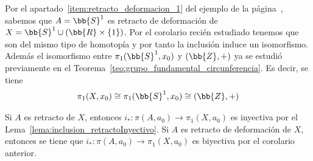 \begin{ejemplo} 
    Por el apartado~\ref{item:retracto_deformacion_1} del ejemplo de la página~\pageref{ejem:retracto_deformacion}, sabemos que $A=\bb{S}^1$ es retracto de deformación de $X=\bb{S}^1 \cup (\bb{R}\times\{1\})$. Por el corolario recién estudiado tenemos que son del mismo tipo de homotopía y por tanto la inclusión induce un isomorfismo. Además el isomorfismo entre $\pi_1(\bb{S}^1, x_0)$ y $(\bb{Z},+)$ ya se estudió previamente en el Teorema~\ref{teo:grupo_fundamental_circunferencia}. Es decir, se tiene
    \begin{gather*}
        \pi_1(X,x_0) \cong \pi_1(\bb{S}^1,x_0) \cong (\bb{Z},+)
    \end{gather*}
\end{ejemplo}

\begin{observacion}
    Si $A$ es retracto de $X$, entonces $i_*:\pi(A,a_0)\to \pi_1(X,a_0)$ es inyectiva por el Lema~\ref{lema:inclusion_retractoInyectivo}. Si $A$ es retracto de deformación de $X$, entonces se tiene que $i_*:\pi(A,a_0)\to \pi_1(X,a_0)$ es biyectiva por el corolario anterior.
\end{observacion}

